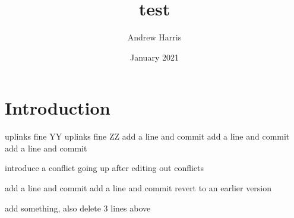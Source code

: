 \documentclass{article}
\title{test}
\author{Andrew Harris}
\date{January 2021}
\begin{document}
\maketitle

\section{Introduction}
uplinks fine YY
uplinks fine ZZ
add a line and commit
add a line and commit
add a line and commit

introduce a conflict going up
after editing out conflicts

add a line and commit
add a line and commit
revert to an earlier version

add something, also delete 3 lines above
\end{document}
